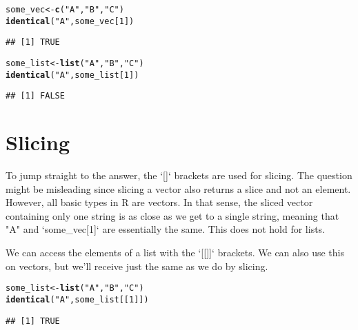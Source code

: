 \documentclass[twoside,twocolumn]{article}\usepackage[]{graphicx}\usepackage[dvipsnames]{xcolor}
\makeatletter
\newcommand{\hlnum}[1]{\textcolor[rgb]{0.686,0.059,0.569}{#1}}%
\newcommand{\hlstr}[1]{\textcolor[rgb]{0.192,0.494,0.8}{#1}}%
\newcommand{\hlstd}[1]{\textcolor[rgb]{0.345,0.345,0.345}{#1}}%
\newcommand{\hlkwb}[1]{\textcolor[rgb]{0.69,0.353,0.396}{#1}}%
\newcommand{\hlkwd}[1]{\textcolor[rgb]{0.737,0.353,0.396}{\textbf{#1}}}%
\newenvironment{kframe}{%
 \def\at@end@of@kframe{}%
 \ifinner\ifhmode%
  \def\at@end@of@kframe{\end{minipage}}%
  \begin{minipage}{\columnwidth}%
 \fi\fi%
 \def\FrameCommand##1{\hskip\@totalleftmargin \hskip-\fboxsep
 \colorbox{shadecolor}{##1}\hskip-\fboxsep
     \hskip-\linewidth \hskip-\@totalleftmargin \hskip\columnwidth}%
 \MakeFramed {\advance\hsize-\width
   \@totalleftmargin\z@ \linewidth\hsize
   \@setminipage}}%
 {\par\unskip\endMakeFramed%
 \at@end@of@kframe}
\newenvironment{knitrout}{}{} %
\makeatother
\begin{document}
\begin{knitrout}
\color{fgcolor}\begin{kframe}
\begin{alltt}
\hlstd{some_vec} \hlkwb{<-} \hlkwd{c}\hlstd{(}\hlstr{"A"}\hlstd{,}\hlstr{"B"}\hlstd{,}\hlstr{"C"}\hlstd{)}
\hlkwd{identical}\hlstd{(}\hlstr{"A"}\hlstd{, some_vec[}\hlnum{1}\hlstd{])}
\end{alltt}
\begin{verbatim}
## [1] TRUE
\end{verbatim}
\begin{alltt}
\hlstd{some_list} \hlkwb{<-} \hlkwd{list}\hlstd{(}\hlstr{"A"}\hlstd{,}\hlstr{"B"}\hlstd{,}\hlstr{"C"}\hlstd{)}
\hlkwd{identical}\hlstd{(}\hlstr{"A"}\hlstd{, some_list[}\hlnum{1}\hlstd{])}
\end{alltt}
\begin{verbatim}
## [1] FALSE
\end{verbatim}
\end{kframe}
\end{knitrout}

\section*{Slicing}
To jump straight to the answer, the `[]` brackets are used for slicing. The question might be misleading since slicing a vector also returns a slice and not an element. However, all basic types in R are vectors. In that sense, the sliced vector containing only one string is as close as we get to a single string, meaning that "A" and `some\_vec[1]` are essentially the same. This does not hold for lists.

We can access the elements of a list with the `[[]]` brackets. We can also use this on vectors, but we'll receive just the same as we do by slicing.
\begin{knitrout}
\color{fgcolor}\begin{kframe}
\begin{alltt}
\hlstd{some_list} \hlkwb{<-} \hlkwd{list}\hlstd{(}\hlstr{"A"}\hlstd{,}\hlstr{"B"}\hlstd{,}\hlstr{"C"}\hlstd{)}
\hlkwd{identical}\hlstd{(}\hlstr{"A"}\hlstd{, some_list[[}\hlnum{1}\hlstd{]])}
\end{alltt}
\begin{verbatim}
## [1] TRUE
\end{verbatim}
\end{kframe}
\end{knitrout}
\end{document}
